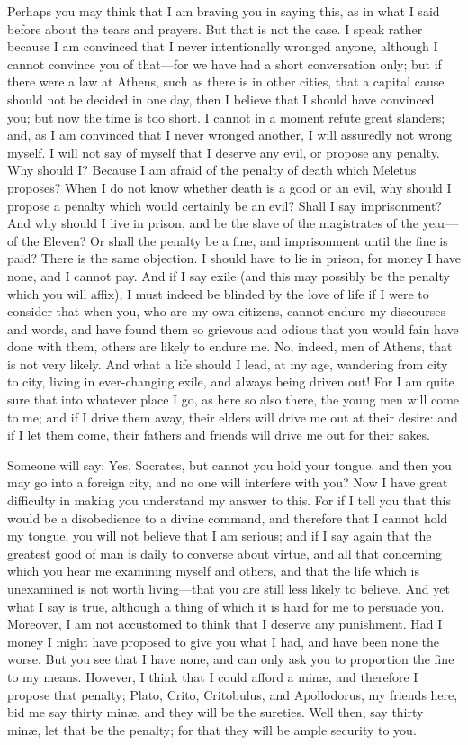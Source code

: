 \documentclass[12pt]{article}
\begin{document}
Perhaps you may think that I am braving you in saying this, as in
what I said before about the tears and prayers. But that is not the
case. I speak rather because I am convinced that I never intentionally
wronged anyone, although I cannot convince you of that---for we have
had a short conversation only; but if there were a law at Athens,
such as there is in other cities, that a capital cause should not
be decided in one day, then I believe that I should have convinced
you; but now the time is too short. I cannot in a moment refute great
slanders; and, as I am convinced that I never wronged another, I will
assuredly not wrong myself. I will not say of myself that I deserve
any evil, or propose any penalty. Why should I? Because I am afraid
of the penalty of death which Meletus proposes? When I do not know
whether death is a good or an evil, why should I propose a penalty
which would certainly be an evil? Shall I say imprisonment? And why
should I live in prison, and be the slave of the magistrates of the
year---of the Eleven? Or shall the penalty be a fine, and imprisonment
until the fine is paid? There is the same objection. I should have
to lie in prison, for money I have none, and I cannot pay. And if
I say exile (and this may possibly be the penalty which you will affix),
I must indeed be blinded by the love of life if I were to consider
that when you, who are my own citizens, cannot endure my discourses
and words, and have found them so grievous and odious that you would
fain have done with them, others are likely to endure me. No, indeed,
men of Athens, that is not very likely. And what a life should I lead,
at my age, wandering from city to city, living in ever-changing exile,
and always being driven out! For I am quite sure that into whatever
place I go, as here so also there, the young men will come to me;
and if I drive them away, their elders will drive me out at their
desire: and if I let them come, their fathers and friends will drive
me out for their sakes.

Someone will say: Yes, Socrates, but cannot you hold your tongue,
and then you may go into a foreign city, and no one will interfere
with you? Now I have great difficulty in making you understand my
answer to this. For if I tell you that this would be a disobedience
to a divine command, and therefore that I cannot hold my tongue, you
will not believe that I am serious; and if I say again that the greatest
good of man is daily to converse about virtue, and all that concerning
which you hear me examining myself and others, and that the life which
is unexamined is not worth living---that you are still less likely
to believe. And yet what I say is true, although a thing of which
it is hard for me to persuade you. Moreover, I am not accustomed to
think that I deserve any punishment. Had I money I might have proposed
to give you what I had, and have been none the worse. But you see
that I have none, and can only ask you to proportion the fine to my
means. However, I think that I could afford a min{\ae}, and therefore
I propose that penalty; Plato, Crito, Critobulus, and Apollodorus,
my friends here, bid me say thirty min{\ae}, and they will be the sureties.
Well then, say thirty min{\ae}, let that be the penalty; for that they
will be ample security to you.
\end{document}
